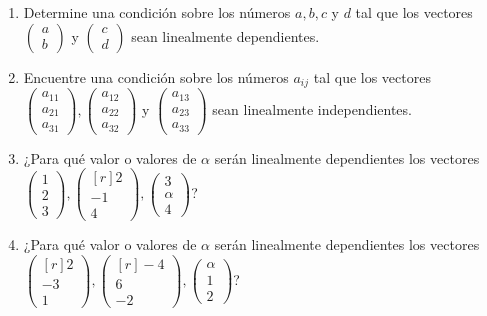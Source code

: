 \begin{enumerate}[start=90]
    \item Determine una condición sobre los números $a, b, c$ y $d$ tal que los vectores $\begin{pmatrix*}a \\ b\end{pmatrix*}$ y $\begin{pmatrix*}c \\ d\end{pmatrix*}$ sean linealmente dependientes.
    \item Encuentre una condición sobre los números $a_{i j}$ tal que los vectores $\begin{pmatrix*}a_{11} \\ a_{21} \\ a_{31}\end{pmatrix*},\begin{pmatrix*}a_{12} \\ a_{22} \\ a_{32}\end{pmatrix*}$ y $\begin{pmatrix*}a_{13} \\ a_{23} \\ a_{33}\end{pmatrix*}$ sean linealmente independientes.
    \item ¿Para qué valor o valores de $\alpha$ serán linealmente dependientes los vectores $\begin{pmatrix*}1 \\ 2 \\ 3\end{pmatrix*},\begin{pmatrix*}[r]2 \\ -1 \\ 4\end{pmatrix*},\begin{pmatrix*}3 \\ \alpha \\ 4\end{pmatrix*}$?
    \item ¿Para qué valor o valores de $\alpha$ serán linealmente dependientes los vectores $\begin{pmatrix*}[r]2 \\ -3 \\ 1\end{pmatrix*},\begin{pmatrix*}[r]-4 \\ 6 \\ -2\end{pmatrix*},\begin{pmatrix*}\alpha \\ 1 \\ 2\end{pmatrix*}$?

\end{enumerate}
